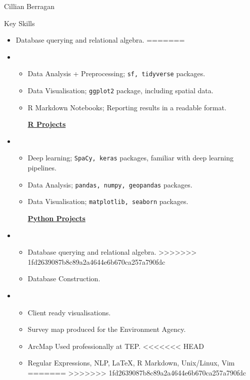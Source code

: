 \documentclass{scrartcl}
\begin{document}
\begin{cv}{Cillian Berragan}
\begin{cvlist}{Key Skills}
\begin{itemize}
\end{itemize}

\vspace{5mm}
\item[\textbf{SQL:}]\begin{itemize}\item Database querying and relational algebra.
=======
\item[\textbf{R:}]\begin{itemize}\item Data Analysis + Preprocessing; \texttt{sf, tidyverse} packages.
\item Data Visualisation; \texttt{ggplot2} package, including spatial data.
\item R Markdown Notebooks; Reporting results in a readable format.

\href{cjber.github.io/tags/r/}{\textbf{R Projects}}
\end{itemize}

\vspace{5mm}
\item[\textbf{Python:}]\begin{itemize}\item Deep learning; \texttt{SpaCy, keras} packages, familiar with deep learning pipelines. 
\item Data Analysis; \texttt{pandas, numpy, geopandas} packages.
\item Data Visualisation; \texttt{matplotlib, seaborn} packages.

    \href{cjber.github.io/tags/python/}{\textbf{Python Projects}}
\end{itemize}

\vspace{5mm}
\item[\textbf{MySQL:}]\begin{itemize}\item Database querying and relational algebra.
>>>>>>> 1fd2639087b8c89a2a4644e6b670ca257a790fdc
\item Database Construction.
\end{itemize}

\vspace{5mm}
\item[\textbf{QGIS \& ArcGIS:}]\begin{itemize}\item Client ready visualisations.
\item Survey map produced for the Environment Agency.
\item ArcMap Used professionally at TEP.
<<<<<<< HEAD
\vspace{5mm}
\item[\textbf{Additional Skills}:] Regular Expressions, NLP, \LaTeX, R Markdown, Unix/Linux, Vim 
=======
>>>>>>> 1fd2639087b8c89a2a4644e6b670ca257a790fdc
\end{itemize}


\end{itemize}
\end{cvlist}
\end{cv}
\end{document}
